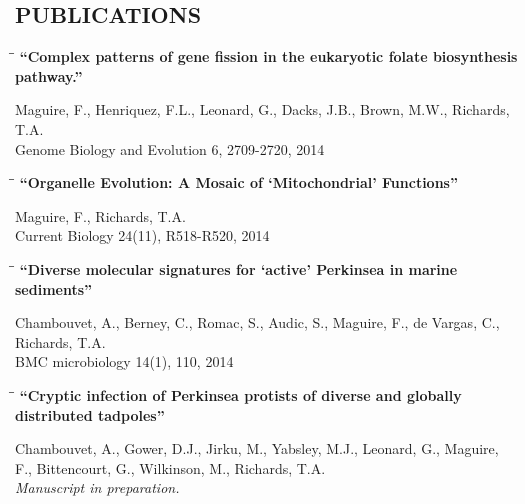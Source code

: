 \documentclass{res}
\begin{document}
\begin{resume}
\section{PUBLICATIONS} 
\vspace{-0.05in}
 \begin{tabbing}
   \hspace{2.3in}\= \hspace{2.6in}\= \kill
   {\bf ``Complex patterns of gene fission in the eukaryotic folate biosynthesis pathway.''\\
  }
   \end{tabbing}\vspace{-20pt}
   Maguire, F., Henriquez, F.L., Leonard, G., Dacks, J.B., Brown, M.W.,  Richards, T.A.\\
   Genome Biology and Evolution 6, 2709-2720, 2014\\

\vspace{-0.2in}
\begin{tabbing}
   \hspace{2.3in}\= \hspace{2.6in}\= \kill
   {\bf ``Organelle Evolution: A Mosaic of `Mitochondrial' Functions''} 
   \end{tabbing}\vspace{-20pt}
    Maguire, F., Richards, T.A.\\ 
    Current Biology 24(11), R518-R520, 2014\\

\vspace{-0.2in}
\begin{tabbing}
   \hspace{2.3in}\= \hspace{2.6in}\= \kill
   {\bf ``Diverse molecular signatures for `active' Perkinsea in marine sediments''} 
   \end{tabbing}\vspace{-20pt}
     Chambouvet, A., Berney, C., Romac, S., Audic, S., Maguire, F., de Vargas, C., Richards, T.A.\\
     BMC microbiology 14(1), 110, 2014\\

\vspace{-0.2in}
\begin{tabbing}
   \hspace{2.3in}\= \hspace{2.6in}\= \kill
   {\bf ``Cryptic infection of Perkinsea protists of diverse and globally distributed tadpoles''}
   \end{tabbing}\vspace{-20pt}
   Chambouvet, A., Gower, D.J., Jirku, M., Yabsley, M.J., Leonard, G., Maguire, F., Bittencourt, G., Wilkinson, M., Richards, T.A.\\
\emph{Manuscript in preparation.}


\end{resume}
\end{document}
